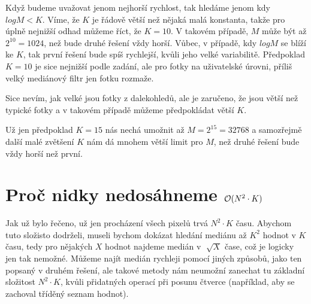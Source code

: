 \documentclass{../../../ksp}
\begin{document}
Když budeme uvažovat jenom nejhorší rychlost, tak hledáme jenom kdy $logM < K$. Víme, že $K$
je řádově větší než nějaká malá konstanta, takže pro úplně nejnižší odhad můžeme říct,
že $K = 10$. V takovém případě, $M$ může být až $2^{10} = 1024$, než bude druhé řešení vždy horší.
Vůbec, v případě, kdy $logM$ se blíží ke $K$, tak první řešení bude spíš rychlejší, kvůli jeho velké variabilitě.
Předpoklad $K = 10$ je sice nejnižší podle zadání, ale pro fotky na uživatelské úrovni,
příliš velký mediánový filtr jen fotku rozmaže.

Sice nevím, jak velké jsou fotky z dalekohledů, ale je zaručeno, že jsou větší než typické fotky
a v takovém případě můžeme předpokládat větší $K$.

Už jen předpoklad $K = 15$ nás nechá umožnit až $M = 2^{15} = 32768$ a samozřejmě další malé zvětšení $K$
nám dá mnohem větší limit pro $M$, než druhé řešení bude vždy horší než první.

\section*{Proč nidky nedosáhneme $\mathcal{O}(N^2 \cdot K)$}

Jak už bylo řečeno, už jen procházení všech pixelů trvá $N^2 \cdot K$ času.
Abychom tuto složisto dodrželi, museli bychom dokázat hledání mediánu až $K^2$ hodnot
v $K$ času, tedy pro nějakých $X$ hodnot najdeme medián v $\sqrt[]{X}$ čase,
což je logicky jen tak nemožné. Můžeme najít medián rychleji pomocí jiných způsobů,
jako ten popsaný v druhém řešení, ale takové metody nám neumožní zanechat tu základní složitost
$N^2 \cdot K$, kvůli přidatných operací při posunu čtverce (například, aby se zachoval tříděný seznam hodnot).
\end{document}
